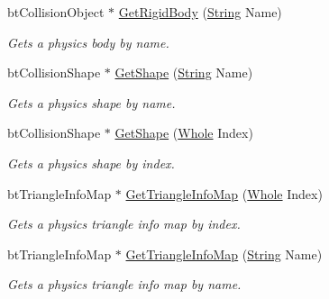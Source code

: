 \begin{DoxyCompactItemize}
btCollisionObject $\ast$ \hyperlink{classMezzanine_1_1internal_1_1BulletFile_a5c09e492abf00a82ccf82755968e7a5c}{GetRigidBody} (\hyperlink{namespaceMezzanine_acf9fcc130e6ebf08e3d8491aebcf1c86}{String} Name)
\begin{DoxyCompactList}\small\item\em Gets a physics body by name. \item\end{DoxyCompactList}\item 
btCollisionShape $\ast$ \hyperlink{classMezzanine_1_1internal_1_1BulletFile_a6f110baeb460957da0410153617440c1}{GetShape} (\hyperlink{namespaceMezzanine_acf9fcc130e6ebf08e3d8491aebcf1c86}{String} Name)
\begin{DoxyCompactList}\small\item\em Gets a physics shape by name. \item\end{DoxyCompactList}\item 
btCollisionShape $\ast$ \hyperlink{classMezzanine_1_1internal_1_1BulletFile_a27882635bb94ec384fc1a02619f31d74}{GetShape} (\hyperlink{namespaceMezzanine_adcbb6ce6d1eb4379d109e51171e2e493}{Whole} Index)
\begin{DoxyCompactList}\small\item\em Gets a physics shape by index. \item\end{DoxyCompactList}\item 
btTriangleInfoMap $\ast$ \hyperlink{classMezzanine_1_1internal_1_1BulletFile_ae59979e178ed8804e85a3e53502fbc6f}{GetTriangleInfoMap} (\hyperlink{namespaceMezzanine_adcbb6ce6d1eb4379d109e51171e2e493}{Whole} Index)
\begin{DoxyCompactList}\small\item\em Gets a physics triangle info map by index. \item\end{DoxyCompactList}\item 
btTriangleInfoMap $\ast$ \hyperlink{classMezzanine_1_1internal_1_1BulletFile_a0b9b5a30adf8cc2066a288d9dd387523}{GetTriangleInfoMap} (\hyperlink{namespaceMezzanine_acf9fcc130e6ebf08e3d8491aebcf1c86}{String} Name)
\begin{DoxyCompactList}\small\item\em Gets a physics triangle info map by name. \item\end{DoxyCompactList}\end{DoxyCompactItemize}
